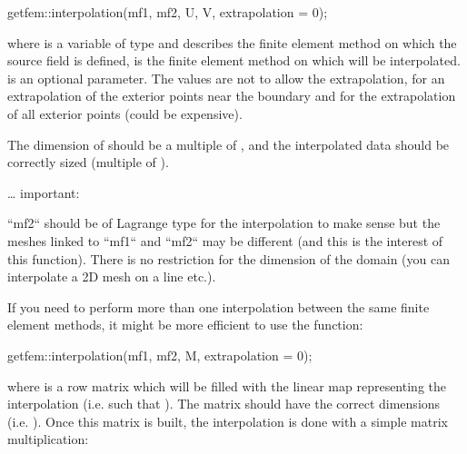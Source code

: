 \documentclass[a4paper,11pt,english]{sphinxmanual}
\begin{document}
\begin{sphinxVerbatim}[commandchars=\\\{\}]
getfem::interpolation(mf1, mf2, U, V, extrapolation = 0);
\end{sphinxVerbatim}

where  is a variable of type  and describes the finite element
method on which the source field  is defined,  is the finite element
method on which  will be interpolated.  is an optional
parameter. The values are  not to allow the extrapolation,  for an
extrapolation of the exterior points near the boundary and  for the
extrapolation of all exterior points (could be expensive).

The dimension of  should be a multiple of , and the
interpolated data  should be correctly sized (multiple of ).

… important:

\begin{sphinxVerbatim}[commandchars=\\\{\}]
``mf2`` should be of Lagrange type for the interpolation to make sense but the
meshes linked to ``mf1`` and ``mf2`` may be different (and this is the
interest of this function). There is no restriction for the dimension of the
domain (you can interpolate a 2D mesh on a line etc.).
\end{sphinxVerbatim}

If you need to perform more than one interpolation between the same finite element
methods, it might be more efficient to use the function:

\begin{sphinxVerbatim}[commandchars=\\\{\}]
getfem::interpolation(mf1, mf2, M, extrapolation = 0);
\end{sphinxVerbatim}

where  is a row matrix which will be filled with the linear map representing
the interpolation (i.e. such that ). The matrix should have the correct
dimensions (i.e. ). Once this matrix is built,
the interpolation is done with a simple matrix multiplication:
\end{document}
